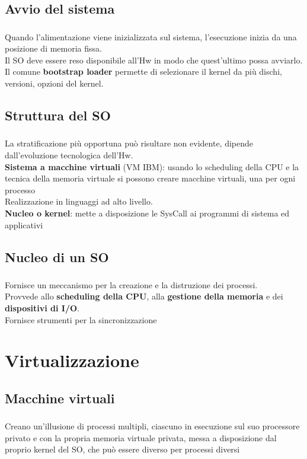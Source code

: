 \documentclass{beamer}
\newenvironment{mainframe}{
	\begin{frame}
		\frametitle{\insertsubsection}
		\framesubtitle{\insertsection}
	}{
	\end{frame}
}
\begin{document}
\subsection{Avvio del sistema}
\begin{mainframe}
	Quando l'alimentazione viene inizializzata sul sistema, l'esecuzione inizia da una posizione di memoria fissa.\\
	Il SO deve essere reso disponibile all'Hw in modo che quest'ultimo possa avviarlo.\\
	Il comune \textbf{bootstrap loader} permette di selezionare il kernel da più dischi, versioni, opzioni del kernel.
\end{mainframe}
\subsection{Struttura del SO}
\begin{mainframe}
	La stratificazione più opportuna può risultare non evidente, dipende dall'evoluzione tecnologica dell'Hw.\\
	\textbf{Sistema a macchine virtuali} (VM IBM): usando lo scheduling della CPU e la tecnica della memoria virtuale si possono creare macchine virtuali, una per ogni processo\\
	Realizzazione in linguaggi ad alto livello.\\
	\textbf{Nucleo o kernel}: mette a disposizione le SysCall ai programmi di sistema ed applicativi
\end{mainframe}
\subsection{Nucleo di un SO}
\begin{mainframe}
	Fornisce un meccanismo per la creazione e la distruzione dei processi.\\
	Provvede allo \textbf{scheduling della CPU}, alla \textbf{gestione della memoria} e dei \textbf{dispositivi di I/O}.\\
	Fornisce strumenti per la sincronizzazione
\end{mainframe}
\section{Virtualizzazione}
\subsection{Macchine virtuali}
\begin{mainframe}
	Creano un'illusione di processi multipli, ciascuno in esecuzione sul suo processore privato e con la propria memoria virtuale privata, messa a disposizione dal proprio kernel del SO, che può essere diverso per processi diversi
\end{mainframe}
\end{document}
